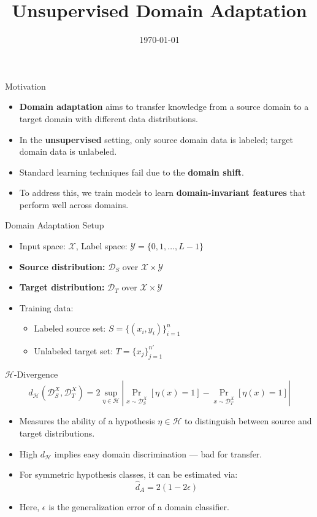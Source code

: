 \documentclass{beamer}
\title[Unsupervised Domain Adaptation]{Unsupervised Domain Adaptation}
\author{}
\institute{Indian Institute of Science, Bangalore}
\date{\today}
\begin{document}
\frame{\titlepage}

\begin{frame}{Motivation}
\begin{itemize}
    \item \textbf{Domain adaptation} aims to transfer knowledge from a source domain to a target domain with different data distributions.
    \item In the \textbf{unsupervised} setting, only source domain data is labeled; target domain data is unlabeled.
    \item Standard learning techniques fail due to the \textbf{domain shift}.
    \item To address this, we train models to learn \textbf{domain-invariant features} that perform well across domains.
\end{itemize}
\end{frame}

\begin{frame}{Domain Adaptation Setup}
\begin{itemize}
    \item Input space: $\mathcal{X}$, Label space: $\mathcal{Y} = \{0, 1, \ldots, L-1\}$
    \item \textbf{Source distribution:} $\mathcal{D}_S$ over $\mathcal{X} \times \mathcal{Y}$
    \item \textbf{Target distribution:} $\mathcal{D}_T$ over $\mathcal{X} \times \mathcal{Y}$
    \item Training data:
    \begin{itemize}
        \item Labeled source set: $S = \{(x_i, y_i)\}_{i=1}^{n}$
        \item Unlabeled target set: $T = \{x_j\}_{j=1}^{n'}$
    \end{itemize}
\end{itemize}
\end{frame}

\begin{frame}{$\mathcal{H}$-Divergence}
\[
d_{\mathcal{H}}(\mathcal{D}_S^X, \mathcal{D}_T^X) = 2 \sup_{\eta \in \mathcal{H}} \left| \Pr_{x \sim \mathcal{D}_S^X}[\eta(x)=1] - \Pr_{x \sim \mathcal{D}_T^X}[\eta(x)=1] \right|
\]

\begin{itemize}
    \item Measures the ability of a hypothesis $\eta \in \mathcal{H}$ to distinguish between source and target distributions.
    \item High $d_{\mathcal{H}}$ implies easy domain discrimination — bad for transfer.
    \item For symmetric hypothesis classes, it can be estimated via:
    \[
    \hat{d}_A = 2 (1 - 2\epsilon)
    \]
    \item Here, $\epsilon$ is the generalization error of a domain classifier.
\end{itemize}
\end{frame}
\end{document}
